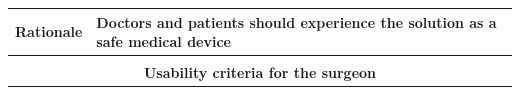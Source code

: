 \documentclass[whitelogo]{tudelft-report}
\begin{document}
{{\begin{table}[]
\begin{tabular}{|l|l|l|l|l|}
\textbf{Rationale}                  & \multicolumn{4}{l|}{Doctors and patients should experience the solution as a safe medical device}                                                                                                                                                                                                                                                                                                                                                                                                                                                                                                                                             \\ \hline
\multicolumn{5}{|l|}{}                                                                                                                                                                                                                                                                                                                                                                                                                                                                                                                                                                                                                                                              \\ \hline
\multicolumn{5}{|c|}{\textbf{Usability criteria for the surgeon}}                                                                                                                                                                                                                                                                                                                                                                                                                                                                                                                                                                                                                   \\ \hline

\end{tabular}
\end{table}}}
\end{document}
